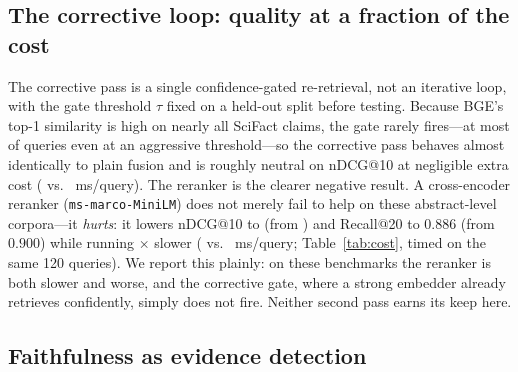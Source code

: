 \documentclass[11pt]{article}
\begin{document}
\subsection{The corrective loop: quality at a fraction of the cost}
\label{sec:corrective}

The corrective pass is a single confidence-gated re-retrieval, not an iterative
loop, with the gate threshold $\tau$ fixed on a held-out split before testing.
Because BGE's top-1 similarity is high on nearly all SciFact claims, the gate
rarely fires---at most \SciCorrMaxFire{} of queries even at an aggressive
threshold---so the corrective pass behaves almost identically to plain fusion and
is roughly neutral on nDCG@10 at negligible extra cost (\CorrMs{} vs.\ \BaseMs{}
ms/query). The reranker is the clearer negative result. A cross-encoder reranker
(\texttt{ms-marco-MiniLM}) does not merely fail to help on these abstract-level
corpora---it \emph{hurts}: it lowers nDCG@10 to \RerankND{} (from \BaseND{}) and
Recall@20 to $0.886$ (from $0.900$) while running \RerankSlowdown$\times$ slower
(\RerankMs{} vs.\ \BaseMs{} ms/query; Table~\ref{tab:cost}, timed on the same 120
queries). We report this plainly: on these benchmarks the reranker is both slower
and worse, and the corrective gate, where a strong embedder already retrieves
confidently, simply does not fire. Neither second pass earns its keep here.

\begin{table}[t]
\centering
\caption{Cost vs.\ quality on SciFact (timed on 120 queries). The cross-encoder
reranker is far slower and \emph{lowers} both nDCG@10 and Recall@20 relative to
plain fusion; the corrective pass adds negligible cost and is roughly neutral.}
\label{tab:cost}
\small

\end{table}

\subsection{Faithfulness as evidence detection}
\end{document}
